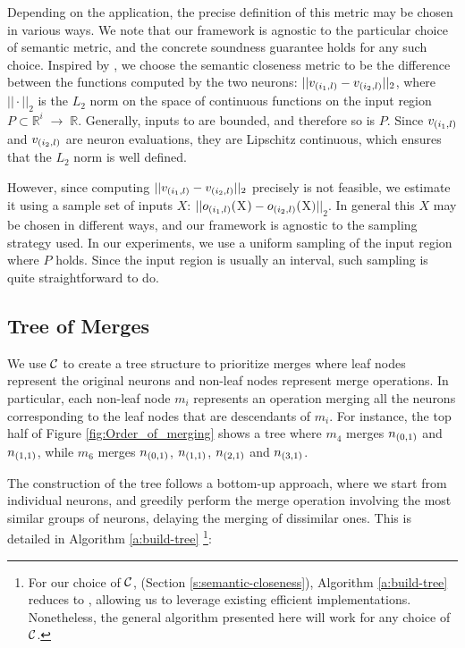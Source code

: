 Depending on the application, the precise definition of this metric may be
chosen in various ways. We note that our framework is agnostic to the particular
choice of semantic metric, and the concrete soundness guarantee holds for any such
choice. Inspired by \cite{deep-abstract}, we choose the
semantic closeness metric to be the difference between the functions computed 
by the two neurons: $||v_{(i_1,l)} - v_{(i_2,l)}||_2$, where $|| \cdot ||_2$ is
the $L_2$ norm on the space of continuous functions on the input region $P
\subset \mathbb{R}^i \;{\rightarrow}\; \mathbb{R}$.
Generally, inputs to \dnn are bounded, and therefore so is $P$. 
Since $v_{(i_1,l)}$ and $v_{(i_2,l)}$ are neuron evaluations, they are
Lipschitz continuous,  which ensures that the $L_2$ norm is well
defined.

However, since computing
$||v_{(i_1,l)} - v_{(i_2,l)}||_2$ precisely is not feasible,
we estimate it using a sample set of inputs $X$: $||o_{(i_1,l)}($X$)
- o_{(i_2,l)}($X$)||_2$. In general this $X$ may be chosen in different ways,
and our framework is agnostic to the sampling strategy used. In our experiments,
we use a uniform sampling of the input region where $P$ holds. 
Since 
the input region is usually an interval, such sampling is
quite straightforward to do.


\subsection{Tree of Merges}
\label{s:tree}

We use $\mathcal{C}$ to create a tree structure to prioritize merges where leaf nodes
represent the original neurons and non-leaf nodes represent merge operations. In
particular, each non-leaf node $m_i$ represents an operation merging all the neurons
corresponding to the leaf nodes that are descendants of $m_i$. For instance, 
the top half of Figure \ref{fig:Order_of_merging} shows a tree where $m_4$
merges $n_{(0,1)}$ and $n_{(1,1)}$, while $m_6$ merges $n_{(0,1)}$,
$n_{(1,1)}$, $n_{(2,1)}$ and $n_{(3,1)}$.

The construction of the tree follows a bottom-up approach, where we start from
individual neurons, and greedily perform the merge operation involving the most
similar groups of neurons, delaying the merging of dissimilar ones. This is
detailed in Algorithm \ref{a:build-tree} \footnote{ 
For our choice of $\mathcal{C}$, (Section \ref{s:semantic-closeness}), Algorithm
\ref{a:build-tree} reduces to \hcluster, allowing us to leverage existing
efficient implementations. Nonetheless, the
general algorithm presented here will work for any choice of $\mathcal{C}$.}:

